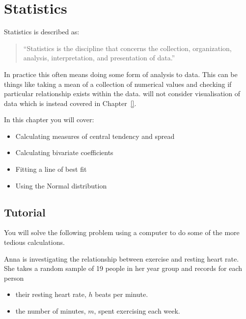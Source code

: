 \chapter{Statistics}
\label{chp:statistics}

Statistics is described as:
\begin{quote}
``Statistics is the discipline that concerns the collection, organization,
analysis, interpretation, and presentation of data.''
\end{quote}


In practice this often means doing some form of analysis to data.
This can be things like taking a mean of a collection of numerical
values and checking if particular relationship exists within the data.
will not consider visualisation of data which is instead covered in
Chapter~\ref{}.



\begin{note}
In this chapter you will cover:
\begin{itemize}
\item 

Calculating measures of central tendency and spread

\item 

Calculating bivariate coefficients

\item 

Fitting a line of best fit

\item 

Using the Normal distribution

\end{itemize}
\end{note}





\section{Tutorial}
\label{\detokenize{tools-for-mathematics/08-statistics/tutorial/main:tutorial}}\label{\detokenize{tools-for-mathematics/08-statistics/tutorial/main::doc}}

You will solve the following problem using a computer to do some of the more
tedious calculations.

Anna is investigating the relationship between exercise and resting heart rate.
She takes a random sample of 19 people in her year group and records for each person
\begin{itemize}
\item 

their resting heart rate, \(h\) beats per minute.

\item 

the number of minutes, \(m\), spent exercising each week.

\end{itemize}



